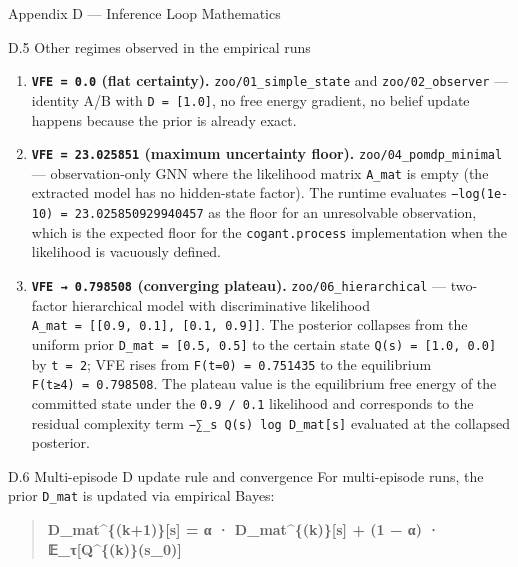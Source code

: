 \documentclass[
  ignorenonframetext,
]{beamer}
\begin{document}
\begin{frame}[fragile]{Appendix D --- Inference Loop Mathematics}
\begin{block}{D.5 Other regimes observed in the empirical runs}
\begin{enumerate}
\item
  \textbf{\texttt{VFE\ =\ 0.0} (flat certainty).}
  \texttt{zoo/01\_simple\_state} and \texttt{zoo/02\_observer} ---
  identity A/B with \texttt{D\ =\ {[}1.0{]}}, no free energy gradient,
  no belief update happens because the prior is already exact.
\item
  \textbf{\texttt{VFE\ =\ 23.025851} (maximum uncertainty floor).}
  \texttt{zoo/04\_pomdp\_minimal} --- observation-only GNN where the
  likelihood matrix \texttt{A\_mat} is empty (the extracted model has no
  hidden-state factor). The runtime evaluates
  \texttt{−log(1e-10)\ =\ 23.025850929940457} as the floor for an
  unresolvable observation, which is the expected floor for the
  \texttt{cogant.process} implementation when the likelihood is
  vacuously defined.
\item
  \textbf{\texttt{VFE\ →\ 0.798508} (converging plateau).}
  \texttt{zoo/06\_hierarchical} --- two-factor hierarchical model with
  discriminative likelihood
  \texttt{A\_mat\ =\ {[}{[}0.9,\ 0.1{]},\ {[}0.1,\ 0.9{]}{]}}. The
  posterior collapses from the uniform prior
  \texttt{D\_mat\ =\ {[}0.5,\ 0.5{]}} to the certain state
  \texttt{Q(s)\ =\ {[}1.0,\ 0.0{]}} by \texttt{t\ =\ 2}; VFE rises from
  \texttt{F(t=0)\ =\ 0.751435} to the equilibrium
  \texttt{F(t≥4)\ =\ 0.798508}. The plateau value is the equilibrium
  free energy of the committed state under the \texttt{0.9\ /\ 0.1}
  likelihood and corresponds to the residual complexity term
  \texttt{−∑\_s\ Q(s)\ log\ D\_mat{[}s{]}} evaluated at the collapsed
  posterior.
\end{enumerate}
\end{block}

\begin{block}{D.6 Multi-episode D update rule and convergence}
\protect{}\label{d.6-multi-episode-d-update-rule-and-convergence}
For multi-episode runs, the prior \texttt{D\_mat} is updated via
empirical Bayes:

\begin{quote}
\textbf{D\_mat\^{}\{(k+1)\}{[}s{]} = α · D\_mat\^{}\{(k)\}{[}s{]} + (1 −
α) · 𝔼\_τ{[}Q\^{}\{(k)\}(s\_0){]}}
\end{quote}


\end{block}
\end{frame}
\end{document}
